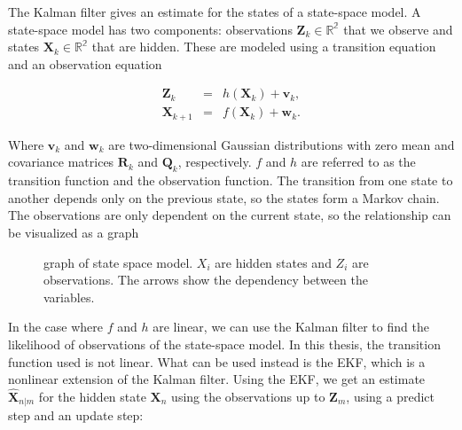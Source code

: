 The Kalman filter gives an estimate for the states of a state-space model. A state-space model has two components: observations $\textbf{Z}_k\in \mathbb{R^2}$ that we observe and states $\textbf{X}_k\in \mathbb{R^2}$ that are hidden. These are modeled using a transition equation and an observation equation

$$
\begin{array}{lcl}
\textbf{Z}_k &=& h(\textbf{X}_k) + \textbf{v}_k,
\\
\textbf{X}_{k+1} &=& f(\textbf{X}_k) + \textbf{w}_k.
\end{array}
$$

 Where $\textbf{v}_k$ and $\textbf{w}_k$ are two-dimensional Gaussian distributions with zero mean and covariance matrices $\textbf{R}_k$ and $\textbf{Q}_k$, respectively. $f$ and $h$ are referred to as the transition function and the observation function. The transition from one state to another depends only on the previous state, so the states form a Markov chain. The observations are only dependent on the current state, so the relationship can be visualized as a graph

\begin{figure}[H]
\begin{center}
\end{center}
     \caption[State space model]{graph of state space model. $X_i$ are hidden states and $Z_i$ are observations. The arrows show the dependency between the variables.}
    \label{fig: state space model}
\end{figure}
 
 In the case where $f$ and $h$ are linear, we can use the Kalman filter to find the likelihood of observations of the state-space model. In this thesis, the transition function used is not linear. What can be used instead is the EKF, which is a nonlinear extension of the Kalman filter. Using the EKF, we get an estimate $\hat{\textbf{X}}_{n|m}$ for the hidden state $\textbf{X}_n$ using the observations up to $\textbf{Z}_m$, using a predict step and an update step:




